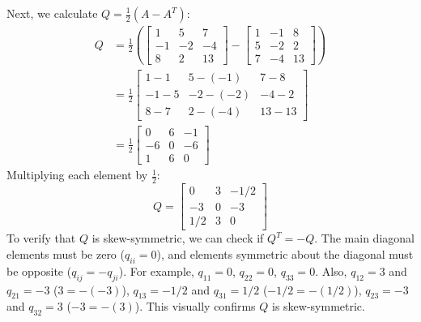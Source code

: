 \documentclass{article}
\begin{document}
Next, we calculate $Q = \frac{1}{2}(A - A^T)$:
\begin{align*} Q &= \frac{1}{2} \left( \begin{bmatrix} 1 & 5 & 7 \\ -1 & -2 & -4 \\ 8 & 2 & 13 \end{bmatrix} - \begin{bmatrix} 1 & -1 & 8 \\ 5 & -2 & 2 \\ 7 & -4 & 13 \end{bmatrix} \right) \\ &= \frac{1}{2} \begin{bmatrix} 1-1 & 5-(-1) & 7-8 \\ -1-5 & -2-(-2) & -4-2 \\ 8-7 & 2-(-4) & 13-13 \end{bmatrix} \\ &= \frac{1}{2} \begin{bmatrix} 0 & 6 & -1 \\ -6 & 0 & -6 \\ 1 & 6 & 0 \end{bmatrix} \end{align*}
Multiplying each element by $\frac{1}{2}$:
\[ Q = \begin{bmatrix} 0 & 3 & -1/2 \\ -3 & 0 & -3 \\ 1/2 & 3 & 0 \end{bmatrix} \]
To verify that $Q$ is skew-symmetric, we can check if $Q^T = -Q$. The main diagonal elements must be zero ($q_{ii}=0$), and elements symmetric about the diagonal must be opposite ($q_{ij} = -q_{ji}$). For example, $q_{11}=0$, $q_{22}=0$, $q_{33}=0$. Also, $q_{12}=3$ and $q_{21}=-3$ ($3 = -(-3)$), $q_{13}=-1/2$ and $q_{31}=1/2$ ($-1/2 = -(1/2)$), $q_{23}=-3$ and $q_{32}=3$ ($-3 = -(3)$). This visually confirms $Q$ is skew-symmetric.
\end{document}
